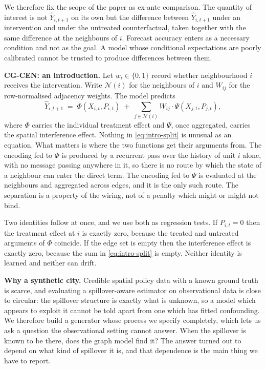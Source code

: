 \documentclass[journal]{IEEEtran}
\newcommand{\CGCEN}{CG\mbox{-}CEN}
\begin{document}
We therefore fix the scope of the paper as ex-ante comparison. The quantity of
interest is not $\hat{Y}_{i,t+1}$ on its own but the difference between
$\hat{Y}_{i,t+1}$ under an intervention and under the untreated counterfactual,
taken together with the same difference at the neighbours of $i$. Forecast
accuracy enters as a necessary condition and not as the goal. A model whose
conditional expectations are poorly calibrated cannot be trusted to produce
differences between them.

\textbf{\CGCEN{}: an introduction.} Let $w_i \in \{0,1\}$ record whether
neighbourhood $i$ receives the intervention. Write $\mathcal{N}(i)$ for the
neighbours of $i$ and $W_{ij}$ for the row-normalised adjacency weights. The
model predicts
\begin{equation}
  \hat{Y}_{i,t+1} \;=\; \Phi(X_{i,t}, P_{i,t})
  \;+\; \sum_{j \in \mathcal{N}(i)} W_{ij} \cdot \Psi(X_{j,t}, P_{j,t}),
  \label{eq:intro-split}
\end{equation}
where $\Phi$ carries the individual treatment effect and $\Psi$, once
aggregated, carries the spatial interference effect. Nothing in
\eqref{eq:intro-split} is unusual as an equation. What matters is where the two
functions get their arguments from. The encoding fed to $\Phi$ is produced by a
recurrent pass over the history of unit $i$ alone, with no message passing
anywhere in it, so there is no route by which the state of a neighbour can enter
the direct term. The encoding fed to $\Psi$ is evaluated at the neighbours and
aggregated across edges, and it is the only such route. The separation is a
property of the wiring, not of a penalty which might or might not bind.

Two identities follow at once, and we use both as regression tests. If
$P_{i,t}=0$ then the treatment effect at $i$ is exactly zero, because the treated
and untreated arguments of $\Phi$ coincide. If the edge set is empty then the
interference effect is exactly zero, because the sum in \eqref{eq:intro-split}
is empty. Neither identity is learned and neither can drift.

\textbf{Why a synthetic city.} Credible spatial policy data with a known ground
truth is scarce, and evaluating a spillover-aware estimator on observational
data is close to circular: the spillover structure is exactly what is unknown,
so a model which appears to exploit it cannot be told apart from one which has
fitted confounding. We therefore build a generator whose process we specify
completely, which lets us ask a question the observational setting cannot
answer. When the spillover is known to be there, does the graph model find it?
The answer turned out to depend on what kind of spillover it is, and that
dependence is the main thing we have to report.
\end{document}
